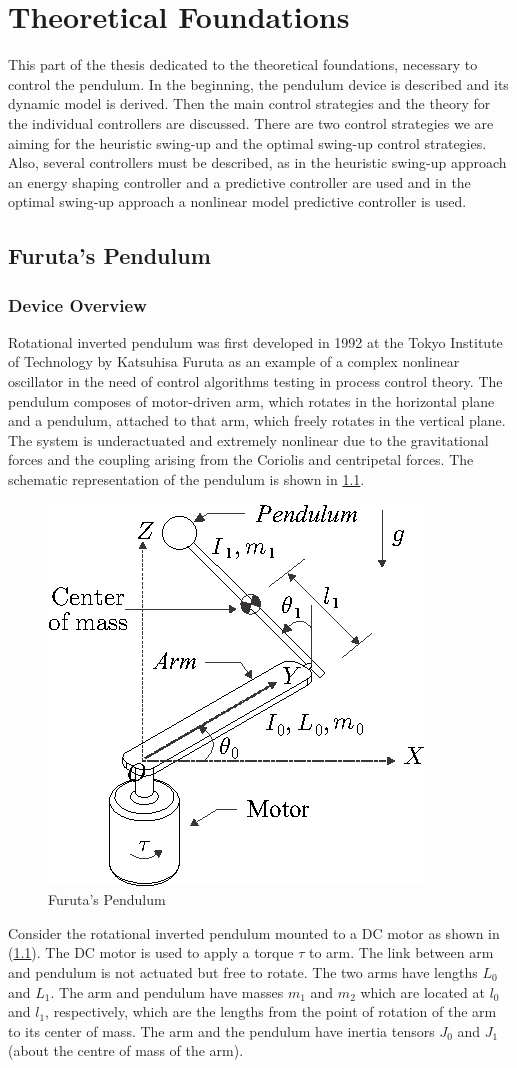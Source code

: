 \chapter{Theoretical Foundations}
This part of the thesis dedicated to the theoretical foundations, necessary to control the pendulum. In the beginning, the pendulum device is described and its dynamic model is derived. Then the main control strategies and the theory for the individual controllers are discussed. There are two control strategies we are aiming for the heuristic swing-up and the optimal swing-up control strategies. Also, several controllers must be described, as in the heuristic swing-up approach an energy shaping controller and a predictive controller are used and in the optimal swing-up approach a nonlinear model predictive controller is used.
\section{Furuta's Pendulum}\label{furuta_Theory}
\subsection{Device Overview}
Rotational inverted pendulum was first developed in 1992 at the Tokyo Institute of Technology by Katsuhisa Furuta as an example of a complex nonlinear oscillator in the need of control algorithms testing in process control theory.
The pendulum composes of motor-driven arm, which rotates in the horizontal plane and a pendulum, attached to that arm, which freely rotates in the vertical plane. The system is underactuated and extremely nonlinear due to the gravitational forces and the coupling arising from the Coriolis and centripetal forces. The schematic representation of the pendulum is shown in \ref{furuta:schematic}.
\begin{figure}[h]
	\centering
	\includegraphics[width=.45\linewidth]{images/furuta}
	\caption{Furuta's Pendulum}
	\label{furuta:schematic}
\end{figure}
\newpage
Consider the rotational inverted pendulum
mounted to a DC motor as shown in (\ref{furuta:schematic}). The DC motor
is used to apply a torque $\tau$ to arm. The link between arm and pendulum is not actuated but free to rotate. The two arms have lengths $L_0$ and $L_1$. The arm and pendulum have masses $m_1$ and $m_2$ which are located at $l_0$ and $l_1$, respectively, which are the lengths from the point of rotation of the arm to its center of mass. The arm and the pendulum have inertia tensors $J_0$ and $J_1$ (about the centre of mass of the arm). \\

